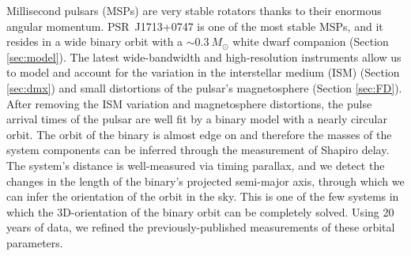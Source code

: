 Millisecond pulsars (MSPs) are very stable rotators thanks to their enormous angular momentum. PSR~J1713+0747 is one of the most stable MSPs, and it resides in a wide binary orbit with a $\sim0.3~M_{\odot}$ white dwarf companion (Section \ref{sec:model}). 
The latest wide-bandwidth and high-resolution instruments allow us to model and account for the variation in the interstellar medium (ISM)
(Section \ref{sec:dmx}) and small distortions of the pulsar's magnetosphere (Section \ref{sec:FD}). 
After removing the ISM variation and magnetosphere distortions, the
pulse arrival times of the pulsar are well fit by a binary model with
a nearly circular orbit.
The orbit of the binary is almost edge on and therefore the masses of
the system components can be inferred through the measurement of Shapiro delay. 
The system's distance is well-measured via timing parallax, and we detect the changes in the length of the binary's projected semi-major axis, through which we can infer the orientation of the orbit in the sky.
This is one of the few systems in which the 3D-orientation of the
binary orbit can be completely solved. Using 20 years of data, we
refined the previously-published measurements of these orbital
parameters.


